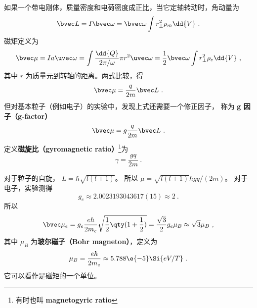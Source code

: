 


如果一个带电刚体，质量密度和电荷密度成正比，当它定轴转动时，角动量为
\begin{equation}
\bvec L = I\bvec \omega  = \bvec \omega \int r_\bot^2 \rho_m \dd{V}~.
\end{equation}
磁矩定义为
\begin{equation}
\bvec \mu  = Ia \uvec\omega = \int \frac{\dd{Q}}{2\pi/\omega}  \pi r^2 \uvec \omega
= \frac12 \bvec \omega \int r_\bot^2\rho_e \dd{V} ~,
\end{equation}
其中 $r$ 为质量元到转轴的距离。两式比较，得
\begin{equation}
\bvec \mu  = \frac{q}{2m} \bvec L~.
\end{equation}
但对基本粒子（例如电子）的实验中，发现上式还需要一个修正因子， 称为 \textbf{g 因子（g-factor）}
\begin{equation}
\bvec \mu  = g\frac{q}{2m}\bvec L~.
\end{equation}
定义\textbf{磁旋比（gyromagnetic ratio）}\footnote{有时也叫 \textbf{magnetogyric ratio}}为
\begin{equation}
\gamma  = \frac{gq}{2m}~.
\end{equation}


对于粒子的自旋， $L = \hbar \sqrt{l(l + 1)} $。 所以 $\mu = \sqrt{l (l + 1)} \hbar gq/(2m)$。 
对于电子，实验测得
\begin{equation}
g_e \approx 2.0023193043617(15) \approx 2~.
\end{equation}
所以
\begin{equation}
\bvec \mu_e  = g_e \frac{e\hbar}{2 m_e} \sqrt{\frac12 \qty(1 + \frac12)}  = \frac{\sqrt 3}{2} g_e \mu_B \approx \sqrt 3 \mu_B~,
\end{equation}
其中 $\mu_B$ 为\textbf{玻尔磁子（Bohr magneton）}，定义为
\begin{equation}
\mu_B = \frac{e\hbar}{2 m_e} \approx 5.788\e{-5} \Si{eV/T}~.
\end{equation}
它可以看作是磁矩的一个单位。
